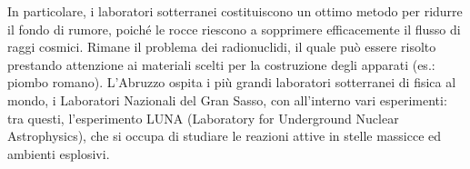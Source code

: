 In particolare, i laboratori sotterranei costituiscono un ottimo metodo per ridurre il fondo di rumore, poiché le rocce riescono a sopprimere efficacemente il flusso di raggi cosmici. Rimane il problema dei radionuclidi, il quale può essere risolto prestando attenzione ai materiali scelti per la costruzione degli apparati (es.: piombo romano). L'Abruzzo ospita i più grandi laboratori sotterranei di fisica al mondo, i Laboratori Nazionali del Gran Sasso, con all'interno vari esperimenti: tra questi, l'esperimento LUNA (Laboratory for Underground Nuclear Astrophysics), che si occupa di studiare le reazioni attive in stelle massicce ed ambienti esplosivi.










